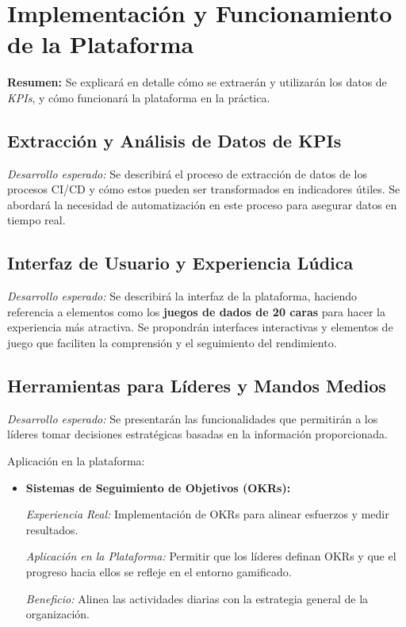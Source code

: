 \documentclass[journal]{IEEEtran}
\begin{document}
\section{\textbf{\Large Implementación y Funcionamiento de la Plataforma}}

\textbf{Resumen:} Se explicará en detalle cómo se extraerán y utilizarán los datos de \textit{KPIs}, y cómo funcionará la plataforma en la práctica.

\subsection{\textbf{Extracción y Análisis de Datos de KPIs}}

\textit{Desarrollo esperado:} Se describirá el proceso de extracción de datos de los procesos CI/CD y cómo estos pueden ser transformados en indicadores útiles. Se abordará la necesidad de automatización en este proceso para asegurar datos en tiempo real.

\subsection{\textbf{Interfaz de Usuario y Experiencia Lúdica}}

\textit{Desarrollo esperado:} Se describirá la interfaz de la plataforma, haciendo referencia a elementos como los \textbf{juegos de dados de 20 caras} para hacer la experiencia más atractiva. Se propondrán interfaces interactivas y elementos de juego que faciliten la comprensión y el seguimiento del rendimiento.

\subsection{\textbf{Herramientas para Líderes y Mandos Medios}}

\textit{Desarrollo esperado:} Se presentarán las funcionalidades que permitirán a los líderes tomar decisiones estratégicas basadas en la información proporcionada.

Aplicación en la plataforma:

\begin{itemize}
    \item \textbf{Sistemas de Seguimiento de Objetivos (OKRs):}
    
    \textit{Experiencia Real:} Implementación de OKRs para alinear esfuerzos y medir resultados.
    
    \textit{Aplicación en la Plataforma:} Permitir que los líderes definan OKRs y que el progreso hacia ellos se refleje en el entorno gamificado.
    
    \textit{Beneficio:} Alinea las actividades diarias con la estrategia general de la organización.
\end{itemize}
\end{document}
